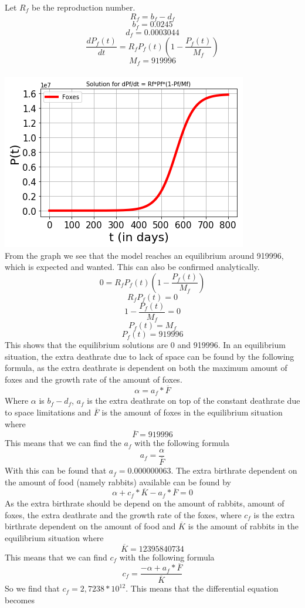 \documentclass{article}
\begin{document}
Let $R_f$ be the reproduction number.
$$R_f = b_f - d_f$$
$$b_f = 0.0245$$
$$d_f = 0.0003044$$
$$\frac{dP_f(t)}{dt} = R_fP_f(t)(1-\frac{P_f(t)}{M_f})$$
$$M_f = 919996$$
\\
\includegraphics[scale=0.78]{Pictures/Foxes.png}
\\
From the graph we see that the model reaches an equilibrium around 919996, which is expected and wanted. This can also be confirmed analytically.
$$0=R_fP_f(t)(1-\frac{P_f(t)}{M_f})$$
$$R_fP_f(t)=0$$
$$1-\frac{P_f(t)}{M_f}=0$$
$$P_f(t)=M_f$$
$$P_f(t)=919996$$
This shows that the equilibrium solutions are 0 and 919996. In an equilibrium situation, the extra deathrate due to lack of space can be found by the following formula, as the extra deathrate is dependent on both the maximum amount of foxes and the growth rate of the amount of foxes.
$$\alpha = a_f * \overline{F}$$
Where $\alpha$ is $b_f-d_f$, $a_f$ is the extra deathrate on top of the constant deathrate due to space limitations and $\overline{F}$ is the amount of foxes in the equilibrium situation where
$$\overline{F} = 919996$$
This means that we can find the $a_f$ with the following formula
$$a_f = \frac{\alpha}{\overline{F}}$$
With this can be found that $a_f = 0.000000063$. The extra birthrate dependent on the amount of food (namely rabbits) available can be found by
$$\alpha + c_f*\overline{K}-a_f*\overline{F}=0$$
As the extra birthrate should be depend on the amount of rabbits, amount of foxes, the extra deathrate and the growth rate of the foxes, where $c_f$ is the extra birthrate dependent on the amount of food and $\overline{K}$ is the amount of rabbits in the equilibrium situation where
$$\overline{K}=12395840734$$
This means that we can find $c_f$ with the following formula
$$c_f=\frac{-\alpha+a_f*\overline{F}}{\overline{K}}$$
So we find that $c_f=2,7238*10^{12}$. This means that the differential equation becomes 
\end{document}
